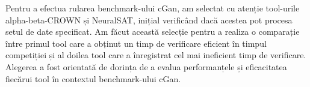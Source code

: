 Pentru a efectua rularea benchmark-ului cGan, am selectat cu atenție tool-urile alpha-beta-CROWN și NeuralSAT, inițial verificând dacă acestea pot procesa setul de date specificat. Am făcut această selecție pentru a realiza o comparație între primul tool care a obținut un timp de verificare eficient în timpul competiției și al doilea tool care a înregistrat cel mai ineficient timp de verificare. Alegerea a fost orientată de dorința de a evalua performanțele și eficacitatea fiecărui tool în contextul benchmark-ului cGan.